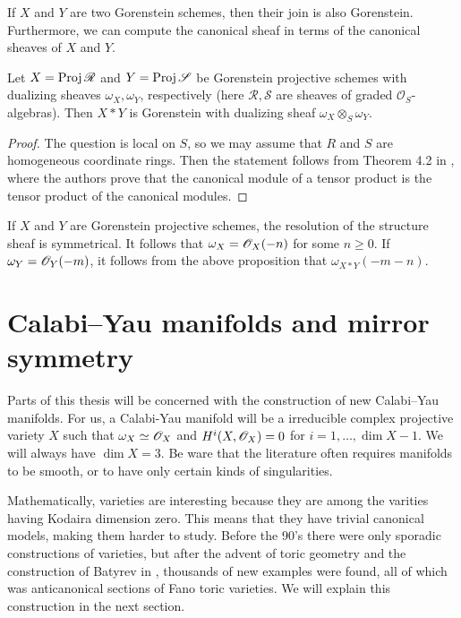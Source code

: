 If $X$ and $Y$ are two Gorenstein schemes, then their join is also Gorenstein. Furthermore, we can compute the canonical sheaf in terms of the canonical sheaves of $X$ and $Y$.

\begin{proposition}
Let $X=\operatorname{Proj} \mathscr R$ and $Y=\operatorname{Proj} \mathscr S$ be Gorenstein projective schemes with dualizing sheaves $\omega_X, \omega_Y$, respectively (here $\mathscr R,\mathscr S$ are sheaves of graded $\mathscr O_S$-algebras). Then $X \ast Y$ is Gorenstein with  dualizing sheaf $\omega_X \otimes_{S} \omega_Y$.
\end{proposition}
\begin{proof}
The question is local on $S$, so we may assume that $R$ and $S$ are homogeneous coordinate rings. Then the statement follows from Theorem 4.2 in \cite{herzog_canonical}, where the authors prove that the canonical module of a tensor product is the tensor product of the canonical modules.
\end{proof}

\begin{remark}
\label{remark:canonical}
If $X$ and $Y$ are Gorenstein projective schemes, the resolution of the structure sheaf is symmetrical. It follows that $\omega_X=\mathscr{O}_X(-n)$ for some $n \geq 0$. If $\omega_Y=\mathscr{O}_Y(-m)$, it follows from the above proposition that $\omega_{X \ast Y}(-m-n)$.
\end{remark}

\section{Calabi--Yau manifolds and mirror symmetry} %
\label{sec:calabi_yau}

Parts of this thesis will be concerned with the construction of new Calabi--Yau manifolds. For us, a Calabi-Yau manifold will be a irreducible complex projective variety $X$ such that $\omega_X \simeq \mathscr{O}_X$ and $H^i(X,\mathscr{O}_X)=0$ for $i=1,\ldots,\dim X-1$. We will always have $\dim X=3$. Be ware that the literature often requires \CY manifolds to be smooth, or to have only certain kinds of singularities.

Mathematically, \CY varieties are interesting because they are among the varities having Kodaira dimension zero. This means that they have trivial canonical models, making them harder to study. Before the 90's there were only sporadic constructions of \CY varieties, but after the advent of toric geometry and the construction of Batyrev in \cite{batyrev_mirrorsymmetry}, thousands of new examples were found, all of which was anticanonical sections of Fano toric varieties. We will explain this construction in the next section. 

